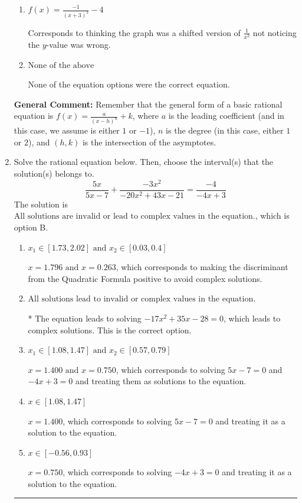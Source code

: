 \documentclass{extbook}[14pt]
\newcommand{\litem}[1]{\item #1

\rule{\textwidth}{0.4pt}}
\begin{document}
\begin{enumerate}
{\begin{enumerate}[label=\Alph*.]
The $y$-value of the equation does not match the graph.
\item \( f(x) = \frac{-1}{(x + 3)^2} - 4 \)

Corresponds to thinking the graph was a shifted version of $\frac{1}{x^2}$ not noticing the $y$-value was wrong.
\item \( \text{None of the above} \)

None of the equation options were the correct equation.
\end{enumerate}

\textbf{General Comment:} Remember that the general form of a basic rational equation is $ f(x) = \frac{a}{(x-h)^n} + k$, where $a$ is the leading coefficient (and in this case, we assume is either $1$ or $-1$), $n$ is the degree (in this case, either $1$ or $2$), and $(h, k)$ is the intersection of the asymptotes.
}
\litem{
Solve the rational equation below. Then, choose the interval(s) that the solution(s) belongs to.
\[ \frac{5x}{5x -7} + \frac{-3x^{2}}{-20x^{2} +43 x -21} = \frac{-4}{-4x + 3} \]The solution is \( \text{All solutions are invalid or lead to complex values in the equation.} \), which is option B.\begin{enumerate}[label=\Alph*.]
\item \( x_1 \in [1.73, 2.02] \text{ and } x_2 \in [0.03,0.4] \)

$x = 1.796 \text{ and } x = 0.263$, which corresponds to making the discriminant from the Quadratic Formula positive to avoid complex solutions.
\item \( \text{All solutions lead to invalid or complex values in the equation.} \)

* The equation leads to solving $-17x^{2} +35 x -28=0$, which leads to complex solutions. This is the correct option.
\item \( x_1 \in [1.08, 1.47] \text{ and } x_2 \in [0.57,0.79] \)

$x = 1.400 \text{ and } x = 0.750$, which corresponds to solving $5x -7 = 0$ and $-4x + 3 = 0$ and treating them as solutions to the equation.
\item \( x \in [1.08,1.47] \)

$x = 1.400$, which corresponds to solving $5x -7 = 0$ and treating it as a solution to the equation.
\item \( x \in [-0.56,0.93] \)

$x = 0.750$, which corresponds to solving $-4x + 3 = 0$ and treating it as a solution to the equation.
\end{enumerate}

}
\end{enumerate}
\end{document}
